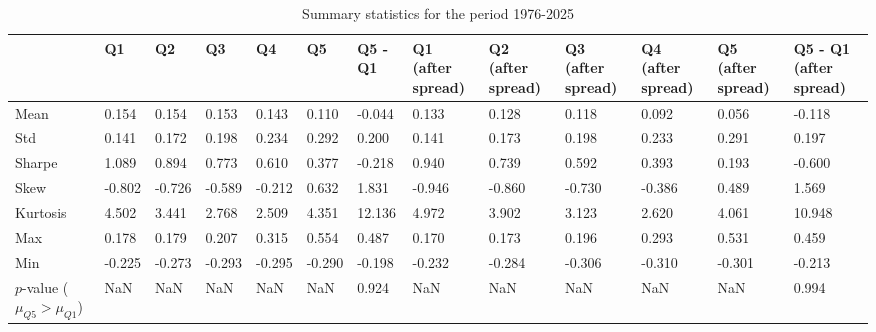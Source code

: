\begin{table}
\caption{Summary statistics for the period 1976-2025}
\label{tab:summary_1976_2025}
\begin{tabular}{lllllllllllll}
\toprule
 & Q1 & Q2 & Q3 & Q4 & Q5 & Q5 - Q1 & Q1 (after spread) & Q2 (after spread) & Q3 (after spread) & Q4 (after spread) & Q5 (after spread) & Q5 - Q1 (after spread) \\
\midrule
Mean & 0.154 & 0.154 & 0.153 & 0.143 & 0.110 & -0.044 & 0.133 & 0.128 & 0.118 & 0.092 & 0.056 & -0.118 \\
Std & 0.141 & 0.172 & 0.198 & 0.234 & 0.292 & 0.200 & 0.141 & 0.173 & 0.198 & 0.233 & 0.291 & 0.197 \\
Sharpe & 1.089 & 0.894 & 0.773 & 0.610 & 0.377 & -0.218 & 0.940 & 0.739 & 0.592 & 0.393 & 0.193 & -0.600 \\
Skew & -0.802 & -0.726 & -0.589 & -0.212 & 0.632 & 1.831 & -0.946 & -0.860 & -0.730 & -0.386 & 0.489 & 1.569 \\
Kurtosis & 4.502 & 3.441 & 2.768 & 2.509 & 4.351 & 12.136 & 4.972 & 3.902 & 3.123 & 2.620 & 4.061 & 10.948 \\
Max & 0.178 & 0.179 & 0.207 & 0.315 & 0.554 & 0.487 & 0.170 & 0.173 & 0.196 & 0.293 & 0.531 & 0.459 \\
Min & -0.225 & -0.273 & -0.293 & -0.295 & -0.290 & -0.198 & -0.232 & -0.284 & -0.306 & -0.310 & -0.301 & -0.213 \\
$p$-value ($\mu_{Q5} > \mu_{Q1}$) & NaN & NaN & NaN & NaN & NaN & 0.924 & NaN & NaN & NaN & NaN & NaN & 0.994 \\
\bottomrule
\end{tabular}
\end{table}
